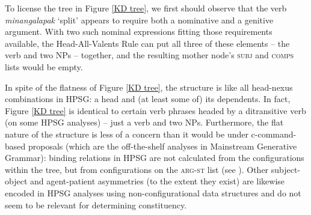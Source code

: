 \documentclass[output=paper
                ,modfonts
                ,nonflat
	        ,collection
	        ,collectionchapter
	        ,collectiontoclongg
 	        ,biblatex
                ,babelshorthands
                ,newtxmath
                ,draftmode
                ,colorlinks, citecolor=brown
]{./langsci/langscibook}
\begin{document}
{To license the tree in Figure \ref{KD tree}, we first should observe that the verb \textit{minangalapak} `split' appears to require both a nominative and a genitive argument. With two such nominal expressions fitting those requirements available, the Head-All-Valents Rule can put all three of these elements -- the verb and two NPs -- together, and the resulting mother node's \textsc{subj} and \textsc{comps} lists would be empty.

In spite of the flatness of Figure \ref{KD tree}, the structure is like all head-nexus combinations in HPSG: a head and (at least some of) its dependents. In fact, Figure \ref{KD tree} is identical to certain verb phrases headed by a ditransitive verb (on some HPSG analyses) -- just a verb and two NPs. Furthermore, the flat nature of the structure is less of a concern than it would be under c-command-based proposals (which are the off-the-shelf analyses in Mainstream Generative Grammar): binding relations in HPSG are not calculated from the configurations within the tree, but from configurations on the \textsc{arg-st} list (see ). Other subject-object and agent-patient asymmetries (to the extent they exist) are likewise encoded in HPSG analyses using non-configurational data structures and do not seem to be relevant for determining constituency.

}
\end{document}
